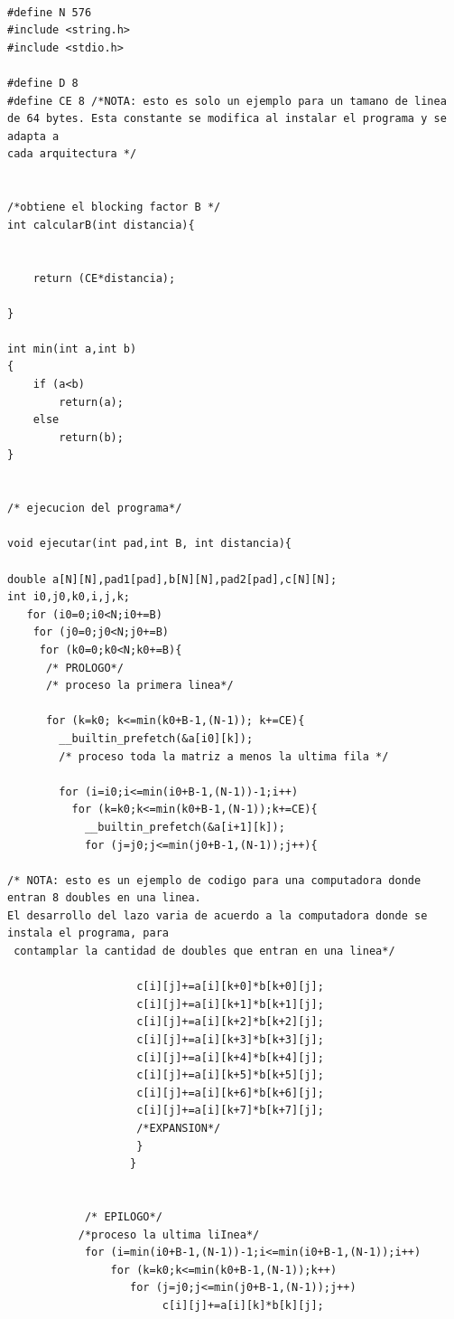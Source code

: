 \documentclass[a4paper,10pt]{article}
\begin{document}
\begin{verbatim}

#define N 576
#include <string.h>
#include <stdio.h>

#define D 8
#define CE 8 /*NOTA: esto es solo un ejemplo para un tamano de linea de 64 bytes. Esta constante se modifica al instalar el programa y se adapta a 
cada arquitectura */


/*obtiene el blocking factor B */
int calcularB(int distancia){


	return (CE*distancia);

}

int min(int a,int b)
{
	if (a<b) 
		return(a);
	else
		return(b);	
}


/* ejecucion del programa*/

void ejecutar(int pad,int B, int distancia){

double a[N][N],pad1[pad],b[N][N],pad2[pad],c[N][N];
int i0,j0,k0,i,j,k;
   for (i0=0;i0<N;i0+=B)
    for (j0=0;j0<N;j0+=B)
     for (k0=0;k0<N;k0+=B){			 
      /* PROLOGO*/
      /* proceso la primera linea*/

      for (k=k0; k<=min(k0+B-1,(N-1)); k+=CE){
        __builtin_prefetch(&a[i0][k]);
        /* proceso toda la matriz a menos la ultima fila */

        for (i=i0;i<=min(i0+B-1,(N-1))-1;i++)      
          for (k=k0;k<=min(k0+B-1,(N-1));k+=CE){
            __builtin_prefetch(&a[i+1][k]);
            for (j=j0;j<=min(j0+B-1,(N-1));j++){

/* NOTA: esto es un ejemplo de codigo para una computadora donde entran 8 doubles en una linea. 
El desarrollo del lazo varia de acuerdo a la computadora donde se instala el programa, para
 contamplar la cantidad de doubles que entran en una linea*/

                    c[i][j]+=a[i][k+0]*b[k+0][j];
                    c[i][j]+=a[i][k+1]*b[k+1][j];
                    c[i][j]+=a[i][k+2]*b[k+2][j];
                    c[i][j]+=a[i][k+3]*b[k+3][j];
                    c[i][j]+=a[i][k+4]*b[k+4][j];
                    c[i][j]+=a[i][k+5]*b[k+5][j];
                    c[i][j]+=a[i][k+6]*b[k+6][j];
                    c[i][j]+=a[i][k+7]*b[k+7][j];
                    /*EXPANSION*/
                    }
                   }	


            /* EPILOGO*/
           /*proceso la ultima liInea*/
            for (i=min(i0+B-1,(N-1))-1;i<=min(i0+B-1,(N-1));i++)
                for (k=k0;k<=min(k0+B-1,(N-1));k++)
                   for (j=j0;j<=min(j0+B-1,(N-1));j++)
                        c[i][j]+=a[i][k]*b[k][j];




\end{verbatim}
\end{document}
